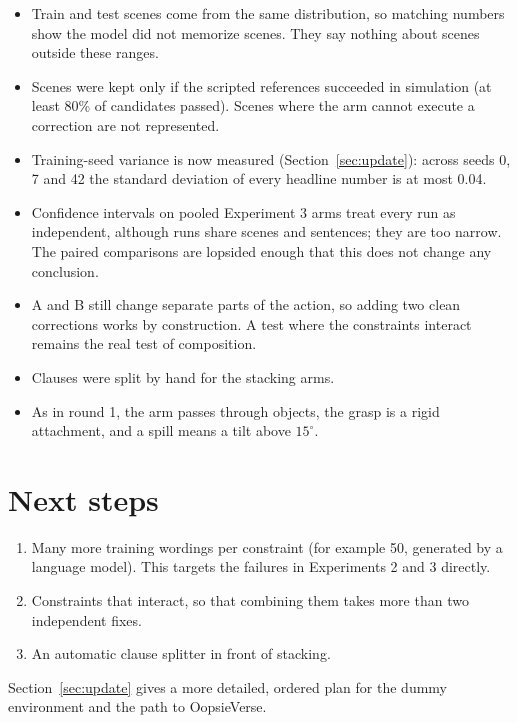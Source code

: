 \documentclass[11pt]{article}
\begin{document}
\begin{itemize}
  \item Train and test scenes come from the same distribution, so matching numbers show the model did
        not memorize scenes. They say nothing about scenes outside these ranges.
  \item Scenes were kept only if the scripted references succeeded in simulation (at least 80\% of
        candidates passed). Scenes where the arm cannot execute a correction are not represented.
  \item Training-seed variance is now measured (Section~\ref{sec:update}): across seeds 0, 7 and 42 the
        standard deviation of every headline number is at most 0.04.
  \item Confidence intervals on pooled Experiment 3 arms treat every run as independent, although runs
        share scenes and sentences; they are too narrow. The paired comparisons are lopsided enough
        that this does not change any conclusion.
  \item A and B still change separate parts of the action, so adding two clean corrections works by
        construction. A test where the constraints interact remains the real test of composition.
  \item Clauses were split by hand for the stacking arms.
  \item As in round 1, the arm passes through objects, the grasp is a rigid attachment, and a spill means
        a tilt above $15^\circ$.
\end{itemize}

\section{Next steps}

\begin{enumerate}
  \item Many more training wordings per constraint (for example 50, generated by a language model).
        This targets the failures in Experiments 2 and 3 directly.
  \item Constraints that interact, so that combining them takes more than two independent fixes.
  \item An automatic clause splitter in front of stacking.
\end{enumerate}
Section~\ref{sec:update} gives a more detailed, ordered plan for the dummy environment and the path to
OopsieVerse.


\end{document}
